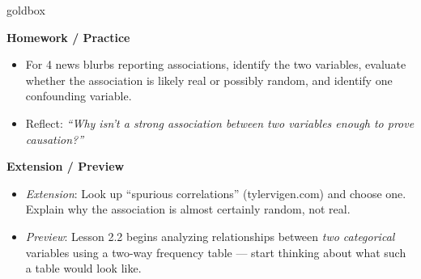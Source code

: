 \documentclass[10pt]{article}
\begin{document}
\begin{skillbox}{goldbox}
\begin{minipage}[t]{0.48\linewidth}
    \textbf{Homework / Practice}
    \begin{itemize}
        \item For 4 news blurbs reporting associations, identify the two variables, evaluate whether the association is likely real or possibly random, and identify one confounding variable.
        \item Reflect: \textit{``Why isn't a strong association between two variables enough to prove causation?''}
    \end{itemize}
\end{minipage}
\hfill
\begin{minipage}[t]{0.48\linewidth}
    \textbf{Extension / Preview}
    \begin{itemize}
        \item \textit{Extension}: Look up ``spurious correlations'' (tylervigen.com) and choose one. Explain why the association is almost certainly random, not real.
        \item \textit{Preview}: Lesson 2.2 begins analyzing relationships between \emph{two categorical} variables using a two-way frequency table --- start thinking about what such a table would look like.
    \end{itemize}
\end{minipage}
\end{skillbox}
\end{document}
